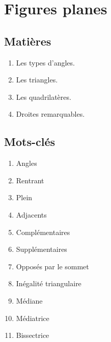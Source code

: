 \documentclass[../../syllabus_1.tex]{subfiles}
\begin{document}
\raggedbottom
\chapter{Figures planes}

\section*{Matières}
\begin{enumerate}[cols=2, label=\textbf{\arabic*.}]
    \item Les types d'angles.
    \item Les triangles.
    \item Les quadrilatères.
    \item Droites remarquables.
\end{enumerate}

\newpage
\section*{Mots-clés}
\begin{enumerate}[cols=2, label=\textbf{\arabic*.}]
    \item Angles
    \item Rentrant
    \item Plein
    \item Adjacents
    \item Complémentaires
    \item Supplémentaires
    \item Opposés par le sommet
    \item Inégalité triangulaire
    \item Médiane
    \item Médiatrice
    \item Bissectrice
\end{enumerate}
\end{document}
